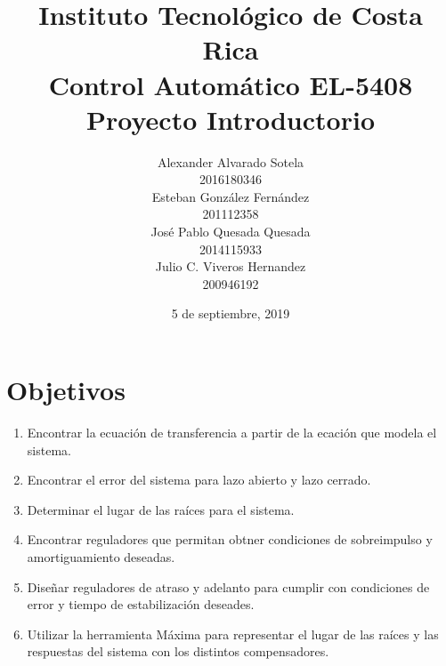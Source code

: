 \documentclass[12pt,letterpaper]{article}
\begin{document}
\title{Instituto Tecnológico de Costa Rica\\Control Automático EL-5408\\Proyecto Introductorio}
\author{Alexander Alvarado Sotela\\2016180346\\Esteban González Fernández \\201112358\\José Pablo Quesada Quesada\\2014115933\\Julio C. Viveros Hernandez\\200946192}
\date{5 de septiembre, 2019}
\maketitle
\section{Objetivos}
\begin{enumerate}
\item Encontrar la ecuación de transferencia a partir de la ecación que modela el sistema.
\item Encontrar el error del sistema para lazo abierto y lazo cerrado. 
\item Determinar el lugar de las raíces para el sistema. 
\item Encontrar reguladores que permitan obtner condiciones de sobreimpulso y amortiguamiento deseadas.
\item Diseñar reguladores de atraso y adelanto para cumplir con condiciones de error y tiempo de estabilización deseades. 
\item Utilizar la herramienta Máxima para representar el lugar de las raíces y las respuestas del sistema con los distintos compensadores.
\end{enumerate} 
 
 
\end{document}
